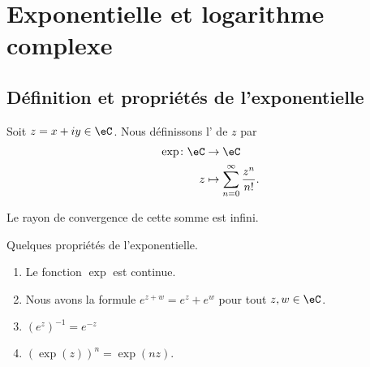 \section{Exponentielle et logarithme complexe}

\subsection{Définition et propriétés de l'exponentielle}

\begin{definition}  \label{DefJilXoM}
    Soit \( z=x+iy\in \eC\). Nous définissons l' de \( z\) par
    \begin{equation}
        \begin{aligned}
            \exp\colon \eC&\to \eC \\
            z&\mapsto \sum_{n=0}^{\infty}\frac{ z^n }{ n! }. 
        \end{aligned}
    \end{equation}
\end{definition}
Le rayon de convergence de cette somme est infini.

\begin{proposition}     \label{PropdDjisy}
    Quelques propriétés de l'exponentielle.
    \begin{enumerate}
        \item
            Le fonction \( \exp\) est continue.
        \item       \label{ITEMooRLHCooJTuYKV}
            Nous avons la formule \(  e^{z+w}= e^{z}+e^w\) pour tout \( z,w\in \eC\).
        \item
            \( (e^z)^{-1}= e^{-z}\)
        \item
            \( (\exp(z))^n=\exp(nz)\).
    \end{enumerate}
\end{proposition}

